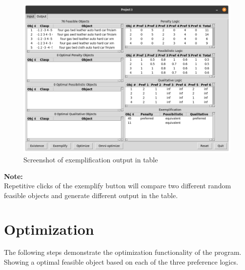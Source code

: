 \documentclass[12pt]{report}
\begin{document}
\begin{description}[leftmargin=4em]
\begin{figure}[H]
\begin{center}
\includegraphics[scale=0.3,trim=1cm 1cm 1cm 1cm]{post_exemplify}
\caption{Screenshot of exemplification output in table}
\end{center}
\end{figure}
\vspace{-2.5em}
\end{description}
\textbf{Note:} \\
Repetitive clicks of the exemplify button will compare two different random feasible objects and generate different output in the table.

\section{Optimization}
The following steps demonstrate the optimization functionality of the program. \\
Showing a optimal feasible object based on each of the three preference logics.\\
\end{document}
